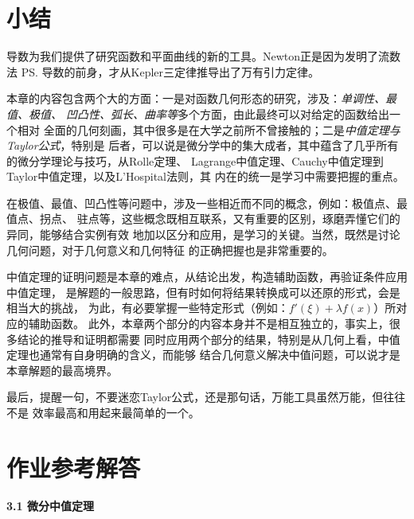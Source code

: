 \section{小结}

导数为我们提供了研究函数和平面曲线的新的工具。Newton正是因为发明了{\kaishu 流数法
\ps{导数的前身}}，才从Kepler三定律推导出了万有引力定律。

本章的内容包含两个大的方面：一是对函数几何形态的研究，涉及：{\it 单调性、最值、极值、
凹凸性、弧长、曲率等}多个方面，由此最终可以对给定的函数给出一个相对
全面的几何刻画，其中很多是在大学之前所不曾接触的；二是{\it 中值定理与Taylor公式}，特别是
后者，可以说是微分学中的集大成者，其中蕴含了几乎所有的微分学理论与技巧，从Rolle定理、
Lagrange中值定理、Cauchy中值定理到Taylor中值定理，以及L'Hospital法则，其
内在的统一是学习中需要把握的重点。

在极值、最值、凹凸性等问题中，涉及一些相近而不同的概念，例如：极值点、最值点、拐点、
驻点等，这些概念既相互联系，又有重要的区别，琢磨弄懂它们的异同，能够结合实例有效
地加以区分和应用，是学习的关键。当然，既然是讨论几何问题，对于几何意义和几何特征
的正确把握也是非常重要的。

中值定理的证明问题是本章的难点，从结论出发，构造辅助函数，再验证条件应用中值定理，
是解题的一般思路，但有时如何将结果转换成可以还原的形式，会是相当大的挑战，
为此，有必要掌握一些特定形式（例如：$f'(\xi)+\lambda f(x)$）所对应的辅助函数。
此外，本章两个部分的内容本身并不是相互独立的，事实上，很多结论的推导和证明都需要
同时应用两个部分的结果，特别是从几何上看，中值定理也通常有自身明确的含义，而能够
结合几何意义解决中值问题，可以说才是本章解题的最高境界。

最后，提醒一句，不要迷恋Taylor公式，还是那句话，万能工具虽然万能，但往往不是
效率最高和用起来最简单的一个。

\visibletrue

\ifvisible

\newpage

\section*{作业参考解答}

\begin{center}
	\bf 3.1 微分中值定理
\end{center}

\bigskip

